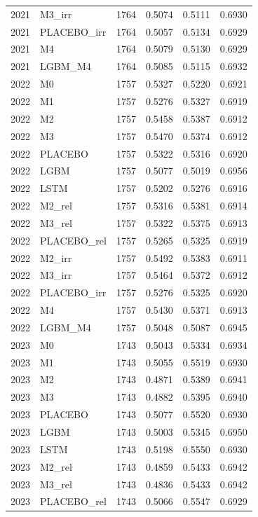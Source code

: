\begin{tabular}{llrrrr}
2021 & M3\_irr & 1764 & 0.5074 & 0.5111 & 0.6930 \\
2021 & PLACEBO\_irr & 1764 & 0.5057 & 0.5134 & 0.6929 \\
2021 & M4 & 1764 & 0.5079 & 0.5130 & 0.6929 \\
2021 & LGBM\_M4 & 1764 & 0.5085 & 0.5115 & 0.6932 \\
2022 & M0 & 1757 & 0.5327 & 0.5220 & 0.6921 \\
2022 & M1 & 1757 & 0.5276 & 0.5327 & 0.6919 \\
2022 & M2 & 1757 & 0.5458 & 0.5387 & 0.6912 \\
2022 & M3 & 1757 & 0.5470 & 0.5374 & 0.6912 \\
2022 & PLACEBO & 1757 & 0.5322 & 0.5316 & 0.6920 \\
2022 & LGBM & 1757 & 0.5077 & 0.5019 & 0.6956 \\
2022 & LSTM & 1757 & 0.5202 & 0.5276 & 0.6916 \\
2022 & M2\_rel & 1757 & 0.5316 & 0.5381 & 0.6914 \\
2022 & M3\_rel & 1757 & 0.5322 & 0.5375 & 0.6913 \\
2022 & PLACEBO\_rel & 1757 & 0.5265 & 0.5325 & 0.6919 \\
2022 & M2\_irr & 1757 & 0.5492 & 0.5383 & 0.6911 \\
2022 & M3\_irr & 1757 & 0.5464 & 0.5372 & 0.6912 \\
2022 & PLACEBO\_irr & 1757 & 0.5276 & 0.5325 & 0.6920 \\
2022 & M4 & 1757 & 0.5430 & 0.5371 & 0.6913 \\
2022 & LGBM\_M4 & 1757 & 0.5048 & 0.5087 & 0.6945 \\
2023 & M0 & 1743 & 0.5043 & 0.5334 & 0.6934 \\
2023 & M1 & 1743 & 0.5055 & 0.5519 & 0.6930 \\
2023 & M2 & 1743 & 0.4871 & 0.5389 & 0.6941 \\
2023 & M3 & 1743 & 0.4882 & 0.5395 & 0.6940 \\
2023 & PLACEBO & 1743 & 0.5077 & 0.5520 & 0.6930 \\
2023 & LGBM & 1743 & 0.5003 & 0.5345 & 0.6950 \\
2023 & LSTM & 1743 & 0.5198 & 0.5550 & 0.6930 \\
2023 & M2\_rel & 1743 & 0.4859 & 0.5433 & 0.6942 \\
2023 & M3\_rel & 1743 & 0.4836 & 0.5433 & 0.6942 \\
2023 & PLACEBO\_rel & 1743 & 0.5066 & 0.5547 & 0.6929 \\

\end{tabular}
